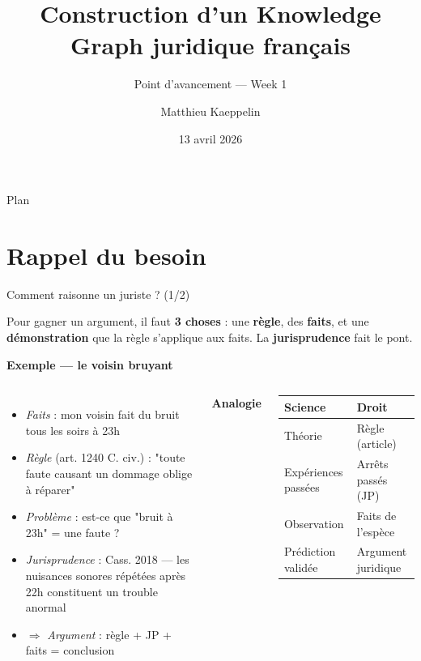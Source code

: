 \documentclass[aspectratio=169,10pt]{beamer}
\title[KG juridique FR]{Construction d'un Knowledge Graph juridique français}
\subtitle{Point d'avancement --- Week 1}
\author{Matthieu Kaeppelin}
\institute{Stage FE Recherche}
\date{13 avril 2026}
\newcommand{\keybox}[1]{%
  \begin{center}
  \colorbox{accentsoft}{\parbox{0.9\linewidth}{\centering #1}}
  \end{center}}
\begin{document}
\begin{frame}
  \titlepage
\end{frame}

\begin{frame}{Plan}
  \tableofcontents
\end{frame}

\section{Rappel du besoin}

\begin{frame}{Comment raisonne un juriste ? (1/2)}
  \keybox{Pour gagner un argument, il faut \textbf{3 choses} : une \textbf{règle}, des \textbf{faits}, et une \textbf{démonstration} que la règle s'applique aux faits. La \textbf{jurisprudence} fait le pont.}

  \vspace{0.3em}
  \textbf{Exemple --- le voisin bruyant}
  \begin{columns}[T]
    \footnotesize
    \begin{itemize}
      \item \textit{Faits} : mon voisin fait du bruit tous les soirs à 23h
      \item \textit{Règle} (art. 1240 C. civ.) : "toute faute causant un dommage oblige à réparer"
      \item \textit{Problème} : est-ce que "bruit à 23h" = une faute ?
      \item \textit{Jurisprudence} : Cass. 2018 --- les nuisances sonores répétées après 22h constituent un trouble anormal
      \item $\Rightarrow$ \textit{Argument} : règle + JP + faits = conclusion
    \end{itemize}

    \centering
    \footnotesize\textbf{Analogie}

    \vspace{0.3em}
    \renewcommand{\arraystretch}{1.15}
    \begin{tabular}{l l}
      \toprule
      \scriptsize\textbf{Science} & \scriptsize\textbf{Droit} \\
      \midrule
      \scriptsize Théorie            & \scriptsize Règle (article) \\
      \scriptsize Expériences passées & \scriptsize Arrêts passés (JP) \\
      \scriptsize Observation         & \scriptsize Faits de l'espèce \\
      \scriptsize Prédiction validée  & \scriptsize Argument juridique \\
      \bottomrule
    \end{tabular}
  \end{columns}


\end{frame}
\end{document}
